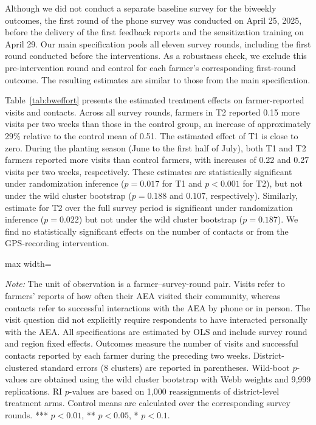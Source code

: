 \documentclass[11pt]{article}
\newcommand{\fittable}[1]{%
  \begin{adjustbox}{max width=\linewidth}\scriptsize\end{adjustbox}}
\newcommand{\tnote}[1]{%
  \par\vspace{3pt}%
  \noindent\begin{minipage}{\linewidth}%
    \scriptsize\setlength{\parindent}{0pt}\textit{Note:} #1%
  \end{minipage}}
\begin{document}
Although we did not conduct a separate baseline survey for the biweekly outcomes, the first round of the phone survey was conducted on April 25, 2025, before the delivery of the first feedback reports and the sensitization training on April 29. Our main specification pools all eleven survey rounds, including the first round conducted before the interventions. As a robustness check, we exclude this pre-intervention round and control for each farmer's corresponding first-round outcome. The resulting estimates are similar to those from the main specification.


Table~\ref{tab:bweffort} presents the estimated treatment effects on farmer-reported visits and contacts. Across all survey rounds, farmers in T2 reported 0.15 more visits per two weeks than those in the control group, an increase of approximately 29\% relative to the control mean of 0.51. The estimated effect of T1 is close to zero. During the planting season (June to the first half of July), both T1 and T2 farmers reported more visits than control farmers, with increases of 0.22 and 0.27 visits per two weeks, respectively. These estimates are statistically significant under randomization inference ($p=0.017$ for T1 and $p<0.001$ for T2), but not under the wild cluster bootstrap ($p=0.188$ and $0.107$, respectively). Similarly, estimate for T2 over the full survey period is significant under randomization inference ($p=0.022$) but not under the wild cluster bootstrap ($p=0.187$). We find no statistically significant effects on the number of contacts or from the GPS-recording intervention. %

\begin{table}[H]
\centering
\caption{Effects on farmer-reported extension visits and contacts}
\label{tab:bweffort}
\fittable{tmp/bw_effort_v2}
\tnote{The unit of observation is a farmer--survey-round pair. Visits refer to farmers' reports of how often their AEA visited their community, whereas contacts refer to successful interactions with the AEA by phone or in person. The visit question did not explicitly require respondents to have interacted personally with the AEA. All specifications are estimated by OLS and include survey round and region
fixed effects. Outcomes measure the number of visits and successful contacts reported by each farmer during the preceding two weeks. District-clustered standard errors (8 clusters) are reported in parentheses. Wild-boot $p$-values are obtained using the wild cluster bootstrap with Webb weights and 9,999 replications. RI $p$-values are based on 1,000 reassignments of district-level treatment arms. Control means are calculated over the corresponding survey rounds.
*** $p<0.01$, ** $p<0.05$, * $p<0.1$.}
\end{table}
\end{document}
